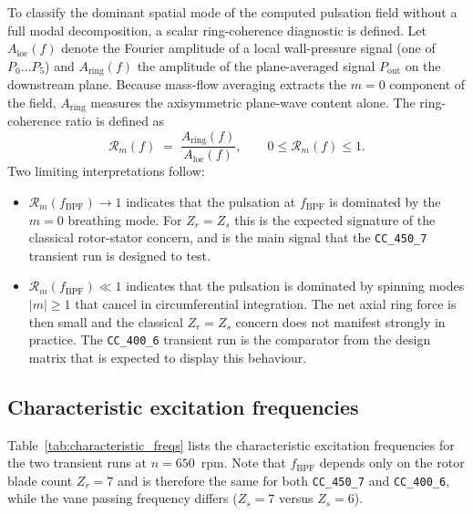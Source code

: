 To classify the dominant spatial mode of the computed pulsation field without a full modal decomposition, a scalar ring-coherence diagnostic is defined. Let $A_{\mathrm{loc}}(f)$ denote the Fourier amplitude of a local wall-pressure signal (one of $P_0 \ldots P_5$) and $A_{\mathrm{ring}}(f)$ the amplitude of the plane-averaged signal $P_{\mathrm{out}}$ on the downstream plane. Because mass-flow averaging extracts the $m=0$ component of the field, $A_{\mathrm{ring}}$ measures the axisymmetric plane-wave content alone. The ring-coherence ratio is defined as
\begin{equation}
    \mathcal{R}_m(f) \;=\;
    \frac{A_{\mathrm{ring}}(f)}{A_{\mathrm{loc}}(f)},
    \qquad 0 \leq \mathcal{R}_m(f) \leq 1. \label{eq:coherence}
\end{equation}
Two limiting interpretations follow:
\begin{itemize}
  \item $\mathcal{R}_m(f_{\mathrm{BPF}}) \to 1$ indicates that the pulsation at $f_{\mathrm{BPF}}$ is dominated by the $m=0$ breathing mode. For $Z_r = Z_s$ this is the expected signature of the classical rotor-stator concern, and is the main signal that the \texttt{CC\_450\_7} transient run is designed to test.
  \item $\mathcal{R}_m(f_{\mathrm{BPF}}) \ll 1$ indicates that the pulsation is dominated by spinning modes $|m|\geq 1$ that cancel in circumferential integration. The net axial ring force is then small and the classical $Z_r = Z_s$ concern does not manifest strongly in practice. The \texttt{CC\_400\_6} transient run is the comparator from the design matrix that is expected to display this behaviour.
\end{itemize}
 
\subsection{Characteristic excitation frequencies}
\label{sec:spec-peaks}
 
Table~\ref{tab:characteristic_freqs} lists the characteristic excitation frequencies for the two transient runs at $n = 650$~rpm. Note that $f_{\mathrm{BPF}}$ depends only on the rotor blade count $Z_r=7$ and is therefore the same for both \texttt{CC\_450\_7} and \texttt{CC\_400\_6}, while the vane passing frequency differs ($Z_s=7$ versus $Z_s=6$).
 
